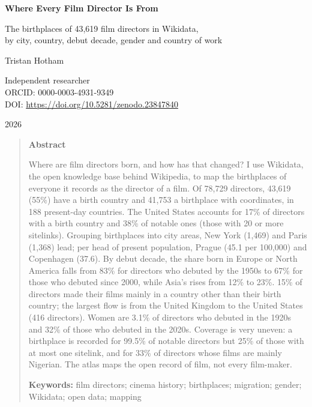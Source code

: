 \documentclass[11pt,a4paper]{article}
\begin{document}
\begin{center}
{\Large\bfseries Where Every Film Director Is From\par}
\vspace{0.4em}
{\large The birthplaces of 43,619 film directors in Wikidata,\\by city, country, debut decade, gender and country of work\par}
\vspace{1.2em}
{\large Tristan Hotham\par}
\vspace{0.3em}
{\small Independent researcher\\
ORCID: 0000-0003-4931-9349\\
DOI: \href{https://doi.org/10.5281/zenodo.23847840}{https://doi.org/10.5281/zenodo.23847840}\par}
\vspace{0.8em}
2026
\end{center}

\begin{quote}
\small
\begin{center}\textbf{Abstract}\end{center}
Where are film directors born, and how has that changed? I use Wikidata, the open knowledge base behind Wikipedia, to map the birthplaces of everyone it records as the director of a film. Of 78,729 directors, 43,619 (55\%) have a birth country and 41,753 a birthplace with coordinates, in 188 present-day countries. The United States accounts for 17\% of directors with a birth country and 38\% of notable ones (those with 20 or more sitelinks). Grouping birthplaces into city areas, New York (1,469) and Paris (1,368) lead; per head of present population, Prague (45.1 per 100,000) and Copenhagen (37.6). By debut decade, the share born in Europe or North America falls from 83\% for directors who debuted by the 1950s to 67\% for those who debuted since 2000, while Asia's rises from 12\% to 23\%. 15\% of directors made their films mainly in a country other than their birth country; the largest flow is from the United Kingdom to the United States (416 directors). Women are 3.1\% of directors who debuted in the 1920s and 32\% of those who debuted in the 2020s. Coverage is very uneven: a birthplace is recorded for 99.5\% of notable directors but 25\% of those with at most one sitelink, and for 33\% of directors whose films are mainly Nigerian. The atlas maps the open record of film, not every film-maker.

\textbf{Keywords:} film directors; cinema history; birthplaces; migration; gender; Wikidata; open data; mapping
\end{quote}
\end{document}
